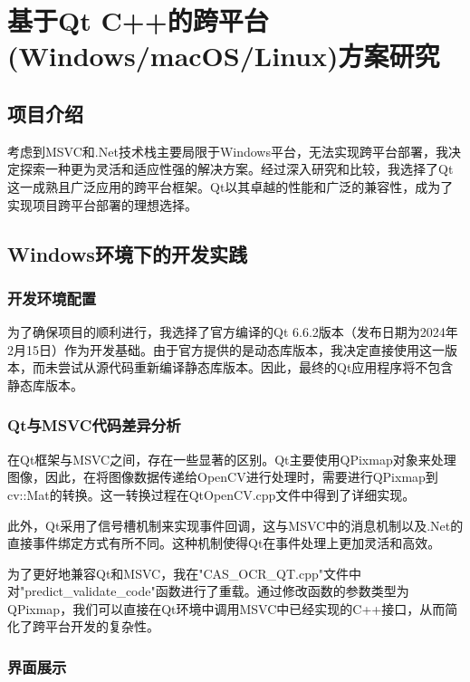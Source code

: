\chapter{基于Qt C++的跨平台(Windows/macOS/Linux)方案研究}
\label{chapter:11}

\section{项目介绍}

考虑到MSVC和.Net技术栈主要局限于Windows平台，无法实现跨平台部署，我决定探索一种更为灵活和适应性强的解决方案。经过深入研究和比较，我选择了Qt这一成熟且广泛应用的跨平台框架。Qt以其卓越的性能和广泛的兼容性，成为了实现项目跨平台部署的理想选择。

\section{Windows环境下的开发实践}

\subsection{开发环境配置}

为了确保项目的顺利进行，我选择了官方编译的Qt 6.6.2版本（发布日期为2024年2月15日）作为开发基础。由于官方提供的是动态库版本，我决定直接使用这一版本，而未尝试从源代码重新编译静态库版本。因此，最终的Qt应用程序将不包含静态库版本。

\subsection{Qt与MSVC代码差异分析}

在Qt框架与MSVC之间，存在一些显著的区别。Qt主要使用QPixmap对象来处理图像，因此，在将图像数据传递给OpenCV进行处理时，需要进行QPixmap到cv::Mat的转换。这一转换过程在QtOpenCV.cpp文件中得到了详细实现。

此外，Qt采用了信号槽机制来实现事件回调，这与MSVC中的消息机制以及.Net的直接事件绑定方式有所不同。这种机制使得Qt在事件处理上更加灵活和高效。

为了更好地兼容Qt和MSVC，我在"CAS\_OCR\_QT.cpp"文件中对"predict\_validate\_code"函数进行了重载。通过修改函数的参数类型为QPixmap，我们可以直接在Qt环境中调用MSVC中已经实现的C++接口，从而简化了跨平台开发的复杂性。

\subsection{界面展示}

